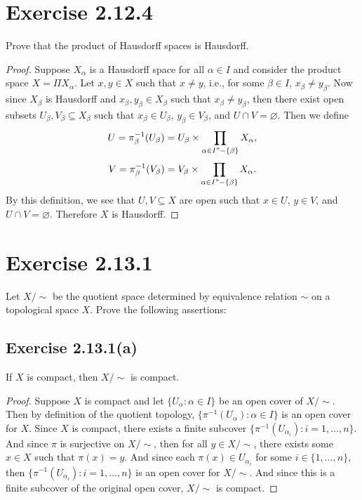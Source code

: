 \documentclass[12pt]{article}
\newenvironment{problem}
    {\begin{lrbox}{\mybox}\begin{minipage}{\textwidth-10pt}}
    {\end{minipage}\end{lrbox}\framebox[6.5in]{\usebox{\mybox}}}
\let\emptyset\varnothing
\begin{document}
\section*{Exercise 2.12.4}
\begin{problem}
    Prove that the product of Hausdorff spaces is Hausdorff.
\end{problem}

\begin{proof}
    Suppose $X_\alpha$ is a Hausdorff space for all $\alpha\in I$ and consider the product space $X=\Pi X_\alpha$. Let $x,y\in X$ such that $x\ne y$, i.e., for some $\beta\in I$, $x_\beta\ne y_\beta$. Now since $X_\beta$ is Hausdorff and $x_\beta,y_\beta\in X_\beta$ such that $x_\beta\ne y_\beta$, then there exist open subsets $U_\beta,V_\beta\subseteq X_\beta$ such that $x_\beta\in U_\beta$, $y_\beta\in V_\beta$, and $U\cap V=\emptyset$. Then we define
    \[U=\pi_\beta^{-1}(U_\beta) = U_\beta \times\prod_{\alpha\in I"-\{\beta\}}X_\alpha,\]
    \[V=\pi_\beta^{-1}(V_\beta) = V_\beta \times\prod_{\alpha\in I"-\{\beta\}}X_\alpha.\]
    By this definition, we see that $U,V\subseteq X$ are open such that $x\in U$, $y\in V$, and $U\cap V=\emptyset$. Therefore $X$ is Hausdorff.
    
\end{proof}

\section*{Exercise 2.13.1}
\begin{problem}
    Let $X/\sim$ be the quotient space determined by equivalence relation $\sim$ on a topological space $X$. Prove the following assertions:
\end{problem}

\subsection*{Exercise 2.13.1(a)}
\begin{problem}
    If $X$ is compact, then $X/\sim$ is compact.
\end{problem}

\begin{proof}
    Suppose $X$ is compact and let $\{U_\alpha : \alpha\in I\}$ be an open cover of $X/\sim$. Then by definition of the quotient topology, $\{\pi^{-1}(U_\alpha) : \alpha\in I\}$ is an open cover for $X$. Since $X$ is compact, there exists a finite subcover $\{\pi^{-1}(U_{\alpha_i}) : i=1,\dots,n\}$. And since $\pi$ is surjective on $X/\sim$, then for all $y\in X/\sim$, there exists some $x\in X$ such that $\pi(x)=y$. And since each $\pi(x)\in U_{\alpha_i}$ for some $i\in\{1,\dots,n\}$, then $\{\pi^{-1}(U_{\alpha_i}) : i=1,\dots,n\}$ is an open cover for $X/\sim$. And since this is a finite subcover of the original open cover, $X/\sim$ is compact.
    
\end{proof}
\end{document}
